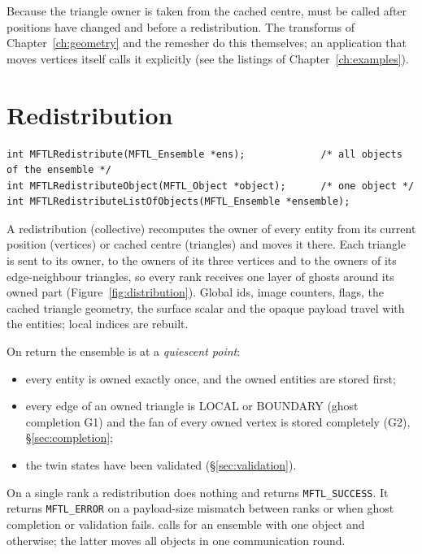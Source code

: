 Because the triangle owner is taken from the cached centre, 
must be called after positions have changed and before a redistribution. The transforms of
Chapter~\ref{ch:geometry} and the remesher do this themselves; an application that moves
vertices itself calls it explicitly (see the listings of Chapter~\ref{ch:examples}).

\section{Redistribution}

\begin{lstlisting}[numbers=none]
int MFTLRedistribute(MFTL_Ensemble *ens);             /* all objects of the ensemble */
int MFTLRedistributeObject(MFTL_Object *object);      /* one object */
int MFTLRedistributeListOfObjects(MFTL_Ensemble *ensemble);
\end{lstlisting}
A redistribution (collective) recomputes the owner of every entity from its current position
(vertices) or cached centre (triangles) and moves it there. Each triangle is sent to its owner,
to the owners of its three vertices and to the owners of its edge-neighbour triangles, so every
rank receives one layer of ghosts around its owned part (Figure~\ref{fig:distribution}). Global
ids, image counters, flags, the cached triangle geometry, the surface scalar and the opaque
payload travel with the entities; local indices are rebuilt.

On return the ensemble is at a \emph{quiescent point}:
\begin{itemize}
  \item every entity is owned exactly once, and the owned entities are stored first;
  \item every edge of an owned triangle is LOCAL or BOUNDARY (ghost completion G1) and the
    fan of every owned vertex is stored completely (G2), \S\ref{sec:completion};
  \item the twin states have been validated (\S\ref{sec:validation}).
\end{itemize}
On a single rank a redistribution does nothing and returns \texttt{MFTL\_SUCCESS}. It returns
\texttt{MFTL\_ERROR} on a payload-size mismatch between ranks or when ghost completion or
validation fails.  calls  for an ensemble with
one object and  otherwise; the latter moves all objects in
one communication round.


